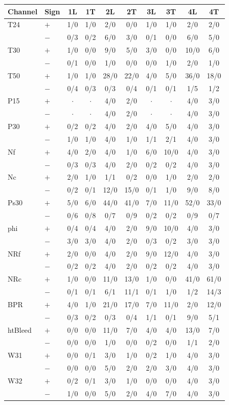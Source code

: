 \begin{tabular}{llcccccccc}\toprule
Channel & Sign & 1L & 1T & 2L & 2T & 3L & 3T & 4L & 4T \\ \midrule
T24 & $+$ & 1/0 & 1/0 & 2/0 & 0/0 & 1/0 & 1/0 & 2/0 & 2/0 \\
 & $-$ & 0/3 & 0/2 & 6/0 & 3/0 & 0/1 & 0/0 & 6/0 & 5/0 \\
T30 & $+$ & 1/0 & 0/0 & 9/0 & 5/0 & 3/0 & 0/0 & 10/0 & 6/0 \\
 & $-$ & 0/1 & 0/0 & 1/0 & 0/0 & 0/0 & 1/0 & 2/0 & 1/0 \\
T50 & $+$ & 1/0 & 1/0 & 28/0 & 22/0 & 4/0 & 5/0 & 36/0 & 18/0 \\
 & $-$ & 0/4 & 0/3 & 0/3 & 0/4 & 0/1 & 0/1 & 1/5 & 1/2 \\
P15 & $+$ & $\cdot$ & $\cdot$ & 4/0 & 2/0 & $\cdot$ & $\cdot$ & 4/0 & 3/0 \\
 & $-$ & $\cdot$ & $\cdot$ & 4/0 & 2/0 & $\cdot$ & $\cdot$ & 4/0 & 3/0 \\
P30 & $+$ & 0/2 & 0/2 & 4/0 & 2/0 & 4/0 & 5/0 & 4/0 & 3/0 \\
 & $-$ & 1/0 & 1/0 & 4/0 & 1/0 & 1/1 & 2/1 & 4/0 & 3/0 \\
Nf & $+$ & 4/0 & 2/0 & 4/0 & 1/0 & 6/0 & 10/0 & 4/0 & 3/0 \\
 & $-$ & 0/3 & 0/3 & 4/0 & 2/0 & 0/2 & 0/2 & 4/0 & 3/0 \\
Nc & $+$ & 2/0 & 1/0 & 1/1 & 0/2 & 0/0 & 1/0 & 2/0 & 2/0 \\
 & $-$ & 0/2 & 0/1 & 12/0 & 15/0 & 0/1 & 1/0 & 9/0 & 8/0 \\
Ps30 & $+$ & 5/0 & 6/0 & 44/0 & 41/0 & 7/0 & 11/0 & 52/0 & 33/0 \\
 & $-$ & 0/6 & 0/8 & 0/7 & 0/9 & 0/2 & 0/2 & 0/9 & 0/7 \\
phi & $+$ & 0/4 & 0/4 & 4/0 & 2/0 & 9/0 & 10/0 & 4/0 & 3/0 \\
 & $-$ & 3/0 & 3/0 & 4/0 & 2/0 & 0/3 & 0/2 & 3/0 & 3/0 \\
NRf & $+$ & 2/0 & 0/0 & 4/0 & 2/0 & 9/0 & 12/0 & 4/0 & 3/0 \\
 & $-$ & 0/2 & 0/2 & 4/0 & 2/0 & 0/2 & 0/2 & 4/0 & 3/0 \\
NRc & $+$ & 1/0 & 0/0 & 11/0 & 13/0 & 1/0 & 0/0 & 41/0 & 61/0 \\
 & $-$ & 0/1 & 0/1 & 6/1 & 11/1 & 0/1 & 1/0 & 1/2 & 14/3 \\
BPR & $+$ & 4/0 & 1/0 & 21/0 & 17/0 & 7/0 & 11/0 & 2/0 & 12/0 \\
 & $-$ & 0/3 & 0/2 & 0/3 & 0/4 & 1/1 & 0/1 & 9/0 & 5/1 \\
htBleed & $+$ & 0/0 & 0/0 & 11/0 & 7/0 & 4/0 & 4/0 & 13/0 & 7/0 \\
 & $-$ & 0/0 & 0/0 & 1/0 & 0/0 & 0/2 & 0/0 & 1/1 & 2/0 \\
W31 & $+$ & 0/0 & 0/1 & 3/0 & 1/0 & 0/2 & 1/0 & 4/0 & 3/0 \\
 & $-$ & 0/0 & 0/0 & 5/0 & 2/0 & 2/0 & 3/0 & 4/0 & 3/0 \\
W32 & $+$ & 0/2 & 0/1 & 3/0 & 1/0 & 0/0 & 0/0 & 4/0 & 3/0 \\
 & $-$ & 1/0 & 0/0 & 5/0 & 2/0 & 4/0 & 7/0 & 4/0 & 3/0 \\
\bottomrule\end{tabular}
